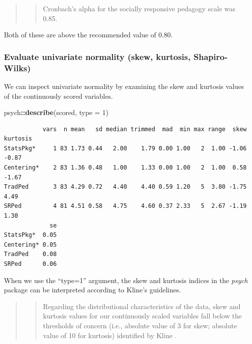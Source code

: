 \documentclass[
  11pt,
]{book}
\newenvironment{Shaded}{\begin{snugshade}}{\end{snugshade}}
\newcommand{\AttributeTok}[1]{\textcolor[rgb]{0.27,0.27,0.27}{#1}}
\newcommand{\DecValTok}[1]{\textcolor[rgb]{0.06,0.06,0.06}{#1}}
\newcommand{\FunctionTok}[1]{\textcolor[rgb]{0.27,0.27,0.27}{\textbf{#1}}}
\newcommand{\NormalTok}[1]{#1}
\newcommand{\SpecialCharTok}[1]{\textcolor[rgb]{0.43,0.43,0.43}{\textbf{#1}}}
\begin{document}
\begin{quote}
\begin{quote}
Cronbach's alpha for the socially responsive pedagogy scale was 0.85.
\end{quote}
\end{quote}

Both of these are above the recommended value of 0.80.

\hypertarget{evaluate-univariate-normality-skew-kurtosis-shapiro-wilks}{%
\subsubsection*{Evaluate univariate normality (skew, kurtosis, Shapiro-Wilks)}\label{evaluate-univariate-normality-skew-kurtosis-shapiro-wilks}}


We can inspect univariate normality by examining the skew and kurtosis values of the continuously scored variables.

\begin{Shaded}
\begin{Highlighting}[]
\NormalTok{psych}\SpecialCharTok{::}\FunctionTok{describe}\NormalTok{(scored, }\AttributeTok{type =} \DecValTok{1}\NormalTok{)}
\end{Highlighting}
\end{Shaded}

\begin{verbatim}
           vars  n mean   sd median trimmed  mad  min max range  skew kurtosis
StatsPkg*     1 83 1.73 0.44   2.00    1.79 0.00 1.00   2  1.00 -1.06    -0.87
Centering*    2 83 1.36 0.48   1.00    1.33 0.00 1.00   2  1.00  0.58    -1.67
TradPed       3 83 4.29 0.72   4.40    4.40 0.59 1.20   5  3.80 -1.75     4.49
SRPed         4 81 4.51 0.58   4.75    4.60 0.37 2.33   5  2.67 -1.19     1.30
             se
StatsPkg*  0.05
Centering* 0.05
TradPed    0.08
SRPed      0.06
\end{verbatim}

When we use the ``type=1'' argument, the skew and kurtosis indices in the \emph{psych} package can be interpreted according to Kline's \citeyearpar{kline_data_2016} guidelines.

\begin{quote}
\begin{quote}
Regarding the distributional characteristics of the data, skew and kurtosis values for our continuously scaled variables fall below the thresholds of concern (i.e., absolute value of 3 for skew; absolute value of 10 for kurtosis) identified by Kline \citeyearpar{kline_data_2016}.
\end{quote}
\end{quote}
\end{document}
